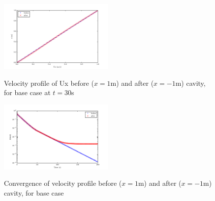 \documentclass[twocolumn,10pt]{asme2ej}
\begin{document}
\begin{figure}[tbh]
\begin{center}
\includegraphics[width=0.5\textwidth]{figure/Ar0.5-Re100 Ux before and after.pdf}
\caption{Velocity profile of Ux before ($x = 1 $m) and after ($x = -1 $m) cavity, for base case at $t=30$s}
\label{velocity_profile}
\includegraphics[width=0.5\textwidth]{figure/convergence.pdf}
\caption{Convergence of velocity profile before ($x = 1 $m) and after ($x = -1 $m) cavity, for base case}
\label{convergence_plot}
\end{center}
\end{figure}
\end{document}
